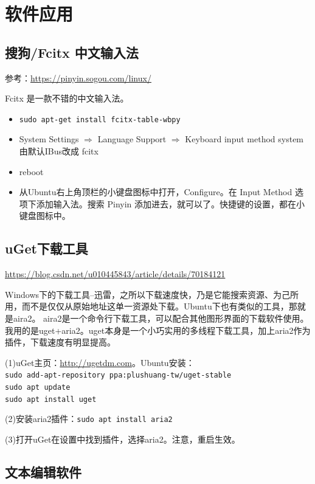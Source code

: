 \chapter{软件应用}
\section{搜狗/Fcitx 中文输入法}
参考：\url{https://pinyin.sogou.com/linux/}

Fcitx 是一款不错的中文输入法。
\begin{itemize}
\item \verb|sudo apt-get install fcitx-table-wbpy|

\item System Settings $\Longrightarrow$ Language Support $\Longrightarrow$
Keyboard input method system 由默认IBus改成 fcitx

\item reboot

\item 从Ubuntu右上角顶栏的小键盘图标中打开，Configure。在 Input Method 选项下添加输入法。搜索 Pinyin 添加进去，就可以了。快捷键的设置，都在小键盘图标中。
\end{itemize}



\section{uGet下载工具}
\url{https://blog.csdn.net/u010445843/article/details/70184121}

Windows下的下载工具--迅雷，之所以下载速度快，乃是它能搜索资源、为己所用，而不是仅仅从原始地址这单一资源处下载。Ubuntu下也有类似的工具，那就是aira2。
aira2是一个命令行下载工具，可以配合其他图形界面的下载软件使用。我用的是uget+aria2。uget本身是一个小巧实用的多线程下载工具，加上aria2作为插件，下载速度有明显提高。

(1)uGet主页：\url{http://ugetdm.com}。Ubuntu安装：\\
\verb|sudo add-apt-repository ppa:plushuang-tw/uget-stable|\\
\verb|sudo apt update|\\
\verb|sudo apt install uget|

(2)安装aria2插件：\verb|sudo apt install aria2|

(3)打开uGet在设置中找到插件，选择aria2。注意，重启生效。





\section{文本编辑软件}
